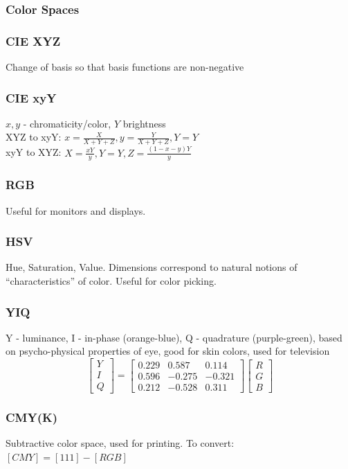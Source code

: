 \documentclass[a4paper,10pt]{article}
\begin{document}
\subsubsection{Color Spaces}
\subsubsection{CIE XYZ} Change of basis so that basis functions are non-negative
\subsubsection{CIE xyY} \( x,y \) - chromaticity/color, \( Y \) brightness\\
XYZ to xyY: \( x = \frac{X}{X+Y+Z}, y = \frac{Y}{X+Y+Z}, Y = Y \) \\
xyY to XYZ: \( X = \frac{xY}{y}, Y = Y, Z = \frac{(1-x-y)Y}{y} \) 
\subsubsection{RGB} Useful for monitors and displays.
\subsubsection{HSV} Hue, Saturation, Value. Dimensions correspond to natural notions of ``characteristics'' of color. Useful for color picking.
\subsubsection{YIQ} Y - luminance, I - in-phase (orange-blue), Q - quadrature (purple-green), based on psycho-physical properties of eye, good for skin colors, used for television
\[
    \left[\begin{smallmatrix} Y \\ I \\ Q \end{smallmatrix}\right] = \left[\begin{smallmatrix} 0.229 & 0.587 & 0.114 \\ 0.596 & -0.275 & -0.321 \\ 0.212 & -0.528 & 0.311 \end{smallmatrix}\right] \left[\begin{smallmatrix} R \\ G \\ B \end{smallmatrix}\right]
\] 
\subsubsection{CMY(K)} Subtractive color space, used for printing. To convert: \( [CMY] = [111] - [RGB]  \)
\end{document}
